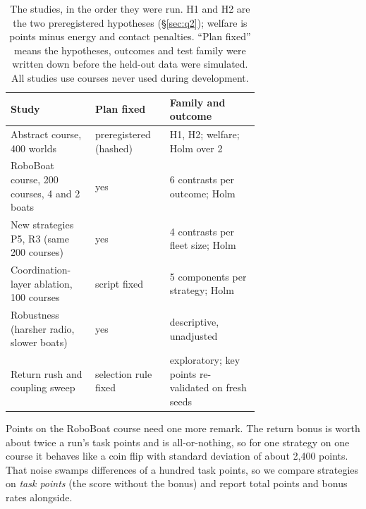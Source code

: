 \documentclass[11pt]{article}
\theoremstyle{definition}
\begin{document}
\begin{table}[t]
\centering\small
\caption{The studies, in the order they were run. H1 and H2 are the two preregistered hypotheses (\S\ref{sec:q2}); welfare is points minus energy and contact penalties. ``Plan fixed'' means the hypotheses, outcomes and test family were written down before the held-out data were simulated. All studies use courses never used during development.}
\label{tab:studies}
\begin{tabular}{p{0.34\linewidth}lp{0.36\linewidth}}
\toprule
Study & Plan fixed & Family and outcome\\\midrule
Abstract course, 400 worlds & preregistered (hashed) & H1, H2; welfare; Holm over 2\\
RoboBoat course, 200 courses, 4 and 2 boats & yes & 6 contrasts per outcome; Holm\\
New strategies P5, R3 (same 200 courses) & yes & 4 contrasts per fleet size; Holm\\
Coordination-layer ablation, 100 courses & script fixed & 5 components per strategy; Holm\\
Robustness (harsher radio, slower boats) & yes & descriptive, unadjusted\\
Return rush and coupling sweep & selection rule fixed & exploratory; key points re-validated on fresh seeds\\
\bottomrule
\end{tabular}
\end{table}

Points on the RoboBoat course need one more remark. The return bonus is worth about twice a run's task points and is all-or-nothing, so for one strategy on one course it behaves like a coin flip with standard deviation of about 2{,}400 points. That noise swamps differences of a hundred task points, so we compare strategies on \emph{task points} (the score without the bonus) and report total points and bonus rates alongside.

\end{document}
